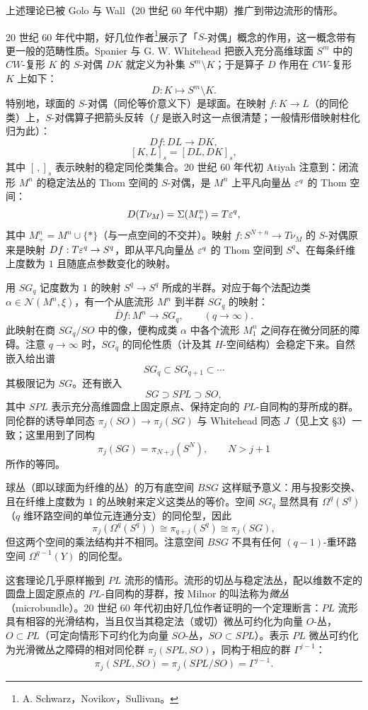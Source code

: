 上述理论已被 Golo 与 Wall（20 世纪 60 年代中期）推广到带边流形的情形。

20 世纪 60 年代中期，好几位作者\footnote{A. Schwarz，Novikov，Sullivan。}展示了「$S$-对偶」概念的作用，这一概念带有更一般的范畴性质。Spanier 与 G. W. Whitehead 把嵌入充分高维球面 $S^m$ 中的 $CW$-复形 $K$ 的 $S$-对偶 $DK$ 就定义为补集 $S^m\setminus K$；于是算子 $D$ 作用在 $CW$-复形 $K$ 上如下：
\[
D:K\mapsto S^m\setminus K.
\]
特别地，球面的 $S$-对偶（同伦等价意义下）是球面。在映射 $f:K\to L$（的同伦类）上，$S$-对偶算子把箭头反转（$f$ 是嵌入时这一点很清楚；一般情形借映射柱化归为此）：
\[
Df:DL\longrightarrow DK,
\]
\[
[K,L]_s=[DL,DK]_s,
\]
其中 $[\,,]_s$ 表示映射的稳定同伦类集合。20 世纪 60 年代初 Atiyah 注意到：闭流形 $M^n$ 的稳定法丛的 Thom 空间的 $S$-对偶，是 $M^n$ 上平凡向量丛 $\varepsilon^q$ 的 Thom 空间：
\[
D(T\nu_M)=\Sigma(M^n_+)=T\varepsilon^q,
\]
其中 $M^n_+=M^n\cup\{*\}$（与一点空间的不交并）。映射 $f:S^{N+n}\to T\nu_M$ 的 $S$-对偶原来是映射 $Df:T\varepsilon^q\to S^q$，即从平凡向量丛 $\varepsilon^q$ 的 Thom 空间到 $S^q$、在每条纤维上度数为 $1$ 且随底点参数变化的映射。

用 $SG_q$ 记度数为 $1$ 的映射 $S^q\to S^q$ 所成的半群。对应于每个法配边类 $\alpha\in\mathcal{N}(M^n,\xi)$，有一个从底流形 $M^n$ 到半群 $SG_q$ 的映射：
\[
\bar Df:M^n\longrightarrow SG_q,\qquad (q\to\infty).
\]
此映射在商 $SG_q/SO$ 中的像，便构成类 $\alpha$ 中各个流形 $M^n_1$ 之间存在微分同胚的障碍。注意 $q\to\infty$ 时，$SG_q$ 的同伦性质（计及其 $H$-空间结构）会稳定下来。自然嵌入给出谱
\[
SG_q\subset SG_{q+1}\subset\cdots
\]
其极限记为 $SG$。还有嵌入
\[
SG\supset SPL\supset SO,
\]
其中 $SPL$ 表示充分高维圆盘上固定原点、保持定向的 $PL$-自同构的芽所成的群。同伦群的诱导单同态 $\pi_j(SO)\to\pi_j(SG)$ 与 Whitehead 同态 $J$（见上文 §3）一致；这里用到了同构
\[
\pi_j(SG)=\pi_{N+j}(S^N),\qquad N>j+1
\]
所作的等同。

球丛（即以球面为纤维的丛）的万有底空间 $BSG$ 这样赋予意义：用与投影交换、且在纤维上度数为 $1$ 的丛映射来定义这类丛的等价。空间 $SG_q$ 显然具有 $\Omega^q(S^q)$（$q$ 维环路空间的单位元连通分支）的同伦型，因此
\[
\pi_j(\Omega^q(S^q))\cong\pi_{q+j}(S^q)\cong\pi_j(SG),
\]
但这两个空间的乘法结构并不相同。注意空间 $BSG$ 不具有任何 $(q-1)$-重环路空间 $\Omega^{q-1}(Y)$ 的同伦型。

这套理论几乎原样搬到 $PL$ 流形的情形。流形的切丛与稳定法丛，配以维数不定的圆盘上固定原点的 $PL$-自同构的芽群，按 Milnor 的叫法称为\emph{微丛}（microbundle）。20 世纪 60 年代初由好几位作者证明的一个定理断言：$PL$ 流形具有相容的光滑结构，当且仅当其稳定法（或切）微丛可约化为向量 $O$-丛，$O\subset PL$（可定向情形下可约化为向量 $SO$-丛，$SO\subset SPL$）。表示 $PL$ 微丛可约化为光滑微丛之障碍的相对同伦群 $\pi_j(SPL,SO)$，同构于相应的群 $\Gamma^{j-1}$：
\begin{equation}
\pi_j(SPL,SO)=\pi_j(SPL/SO)=\Gamma^{j-1}. \tag{4.19}
\end{equation}


